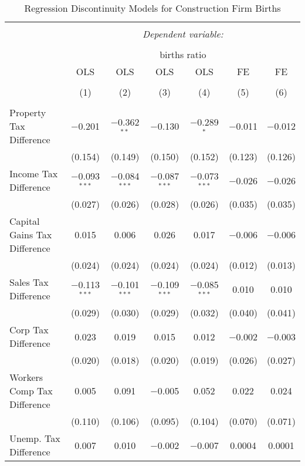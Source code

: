 
\begin{table}[!htbp] \centering 
  \caption{Regression Discontinuity Models for  Construction Firm Births} 
  \label{23rd} 
\footnotesize 
\begin{tabular}{@{\extracolsep{5pt}}lcccccc} 
\\[-1.8ex]\hline 
\hline \\[-1.8ex] 
 & \multicolumn{6}{c}{\textit{Dependent variable:}} \\ 
\cline{2-7} 
\\[-1.8ex] & \multicolumn{6}{c}{births ratio} \\ 
 & OLS & OLS & OLS & OLS & FE & FE \\ 
\\[-1.8ex] & (1) & (2) & (3) & (4) & (5) & (6)\\ 
\hline \\[-1.8ex] 
 Property Tax Difference & $-$0.201 & $-$0.362$^{**}$ & $-$0.130 & $-$0.289$^{*}$ & $-$0.011 & $-$0.012 \\ 
  & (0.154) & (0.149) & (0.150) & (0.152) & (0.123) & (0.126) \\ 
  Income Tax Difference & $-$0.093$^{***}$ & $-$0.084$^{***}$ & $-$0.087$^{***}$ & $-$0.073$^{***}$ & $-$0.026 & $-$0.026 \\ 
  & (0.027) & (0.026) & (0.028) & (0.026) & (0.035) & (0.035) \\ 
  Capital Gains Tax Difference & 0.015 & 0.006 & 0.026 & 0.017 & $-$0.006 & $-$0.006 \\ 
  & (0.024) & (0.024) & (0.024) & (0.024) & (0.012) & (0.013) \\ 
  Sales Tax Difference & $-$0.113$^{***}$ & $-$0.101$^{***}$ & $-$0.109$^{***}$ & $-$0.085$^{***}$ & 0.010 & 0.010 \\ 
  & (0.029) & (0.030) & (0.029) & (0.032) & (0.040) & (0.041) \\ 
  Corp Tax Difference & 0.023 & 0.019 & 0.015 & 0.012 & $-$0.002 & $-$0.003 \\ 
  & (0.020) & (0.018) & (0.020) & (0.019) & (0.026) & (0.027) \\ 
  Workers Comp Tax Difference & 0.005 & 0.091 & $-$0.005 & 0.052 & 0.022 & 0.024 \\ 
  & (0.110) & (0.106) & (0.095) & (0.104) & (0.070) & (0.071) \\ 
  Unemp. Tax Difference & 0.007 & 0.010 & $-$0.002 & $-$0.007 & 0.0004 & 0.0001 \\ 

\end{tabular}
\end{table}
